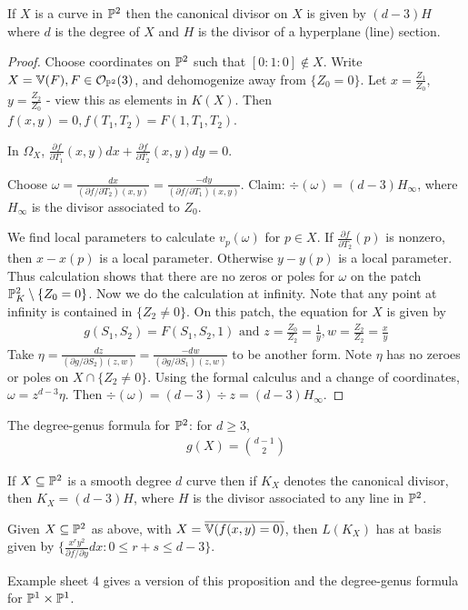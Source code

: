 \documentclass[10pt,a4paper,rgb]{article}
\begin{document}
\begin{proposition}
If $X$ is a curve in $\P^2$ then the canonical divisor on $X$ is given by $(d-3)H$ where $d$ is the degree of $X$ and $H$ is the divisor of a hyperplane (line) section.
\end{proposition}
\begin{proof}
Choose coordinates on $\P^2$ such that $[0:1:0] \notin X$. Write $X = \V(F), F \in \mathcal{O}_{\P^2}(3)$, and dehomogenize away from $\{Z_0 = 0\}$. Let $x = \frac{Z_1}{Z_0}$, $y = \frac{Z_2}{Z_0}$ - view this as elements in $K(X)$. Then $f(x,y) = 0, f(T_1,T_2) = F(1,T_1,T_2)$. 

In $\Omega_X$, $\frac{\partial f}{\partial T_1}(x,y) dx + \frac{\partial f}{\partial T_2}(x,y) dy = 0$.

Choose $\omega = \frac{dx}{(\partial f / \partial T_2)(x,y)} = \frac{-dy}{(\partial f/\partial T_1)(x,y)}$. Claim: $\div(\omega) = (d-3)H_{\infty}$, where $H_\infty$ is the divisor associated to $Z_0$. 

We find local parameters to calculate $v_p(\omega)$ for $p \in X$. If $\frac{\partial f}{\partial T_2}(p)$ is nonzero, then $x-x(p)$ is a local parameter. Otherwise $y-y(p)$ is a local parameter. Thus calculation shows that there are no zeros or poles for $\omega$ on the patch $\P_K^2\setminus \{Z_0=0\}$. Now we do the calculation at infinity. Note that any point at infinity is contained in $\{Z_2 \neq 0 \}$. On this patch, the equation for $X$ is given by
\begin{align*}
g(S_1, S_2) = F(S_1, S_2, 1) \text{ and } z = \frac{Z_0}{Z_2}=\frac{1}{y}, w = \frac{Z_2}{Z_2} = \frac{x}{y}
\end{align*}
Take $\eta = \frac{dz}{(\partial g/\partial S_2)(z,w)} = \frac{-dw}{(\partial g/\partial S_1)(z,w)}$ to be another form. Note $\eta$ has no zeroes or poles on $X \cap \{Z_2 \neq 0\}$. Using the formal calculus and a change of coordinates, $\omega = z^{d-3} \eta$. Then $\div(\omega) = (d-3)\div z = (d-3) H_\infty$.
\end{proof}
\begin{corollary}
The degree-genus formula for $\P^2$: for $d \geq 3$,
\begin{align*}
g(X) = \binom{d-1}{2}
\end{align*}
\end{corollary}
\begin{proposition}
If $X \subseteq \P^2$ is a smooth degree $d$ curve then if $K_X$ denotes the canonical divisor, then $K_X = (d-3)H$, where $H$ is the divisor associated to any line in $\P^2$.
\end{proposition}
\begin{corollary}
Given $X \subseteq \P^2$ as above, with $X = \overline{\V(f(x,y) = 0)}$, then $L(K_X)$ has at basis given by $\{\frac{x^ry^2}{\partial f/\partial y}dx : 0 \leq r+s \leq d-3\}$.
\end{corollary}
Example sheet 4 gives a version of this proposition and the degree-genus formula for $\P^1 \times \P^1$.
\end{document}
